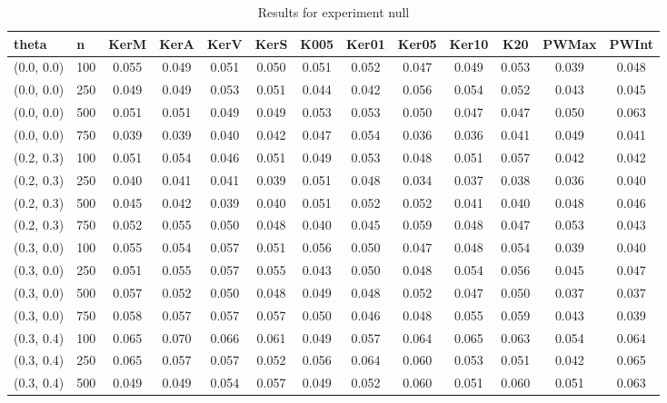 \begin{table}[ht]
	\centering
	
	\caption{Results for experiment null}
	\tiny{
		\begin{tabular}{ll|ccccccccccc}
			\hline
			theta & n & KerM & KerA & KerV & KerS & K005 & Ker01 & Ker05 & Ker10 & K20 & PWMax & PWInt \\
			\hline
			(0.0, 0.0) & 100 & 0.055 & 0.049 & 0.051 & 0.050 & 0.051 & 0.052 & 0.047 & 0.049 & 0.053 & 0.039 & 0.048 \\
			(0.0, 0.0) & 250 & 0.049 & 0.049 & 0.053 & 0.051 & 0.044 & 0.042 & 0.056 & 0.054 & 0.052 & 0.043 & 0.045 \\
			(0.0, 0.0) & 500 & 0.051 & 0.051 & 0.049 & 0.049 & 0.053 & 0.053 & 0.050 & 0.047 & 0.047 & 0.050 & 0.063 \\
			(0.0, 0.0) & 750 & 0.039 & 0.039 & 0.040 & 0.042 & 0.047 & 0.054 & 0.036 & 0.036 & 0.041 & 0.049 & 0.041 \\
			(0.2, 0.3) & 100 & 0.051 & 0.054 & 0.046 & 0.051 & 0.049 & 0.053 & 0.048 & 0.051 & 0.057 & 0.042 & 0.042 \\
			(0.2, 0.3) & 250 & 0.040 & 0.041 & 0.041 & 0.039 & 0.051 & 0.048 & 0.034 & 0.037 & 0.038 & 0.036 & 0.040 \\
			(0.2, 0.3) & 500 & 0.045 & 0.042 & 0.039 & 0.040 & 0.051 & 0.052 & 0.052 & 0.041 & 0.040 & 0.048 & 0.046 \\
			(0.2, 0.3) & 750 & 0.052 & 0.055 & 0.050 & 0.048 & 0.040 & 0.045 & 0.059 & 0.048 & 0.047 & 0.053 & 0.043 \\
			(0.3, 0.0) & 100 & 0.055 & 0.054 & 0.057 & 0.051 & 0.056 & 0.050 & 0.047 & 0.048 & 0.054 & 0.039 & 0.040 \\
			(0.3, 0.0) & 250 & 0.051 & 0.055 & 0.057 & 0.055 & 0.043 & 0.050 & 0.048 & 0.054 & 0.056 & 0.045 & 0.047 \\
			(0.3, 0.0) & 500 & 0.057 & 0.052 & 0.050 & 0.048 & 0.049 & 0.048 & 0.052 & 0.047 & 0.050 & 0.037 & 0.037 \\
			(0.3, 0.0) & 750 & 0.058 & 0.057 & 0.057 & 0.057 & 0.050 & 0.046 & 0.048 & 0.055 & 0.059 & 0.043 & 0.039 \\
			(0.3, 0.4) & 100 & 0.065 & 0.070 & 0.066 & 0.061 & 0.049 & 0.057 & 0.064 & 0.065 & 0.063 & 0.054 & 0.064 \\
			(0.3, 0.4) & 250 & 0.065 & 0.057 & 0.057 & 0.052 & 0.056 & 0.064 & 0.060 & 0.053 & 0.051 & 0.042 & 0.065 \\
			(0.3, 0.4) & 500 & 0.049 & 0.049 & 0.054 & 0.057 & 0.049 & 0.052 & 0.060 & 0.051 & 0.060 & 0.051 & 0.063 \\

\end{tabular}}
\end{table}
